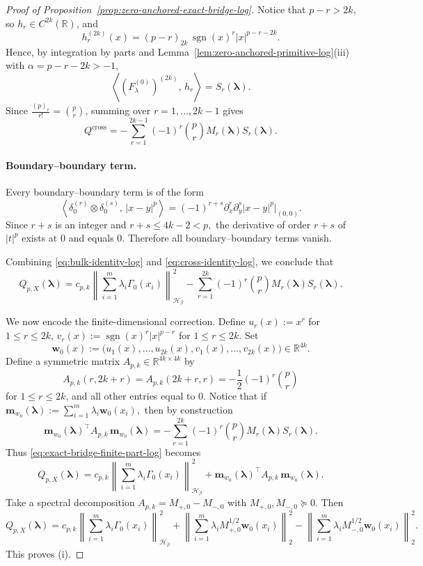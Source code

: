 \documentclass[10pt,a4paper]{amsart}
\begin{document}
\begin{proof}[Proof of Proposition~\ref{prop:zero-anchored-exact-bridge-log}]
Notice that $p-r>2k$, so $h_r\in C^{2k}(\mathbb R)$, and
\[
h_r^{(2k)}(x)
=
(p-r)_{2k}\,\operatorname{sgn}(x)^r |x|^{p-r-2k}.
\]
Hence, by integration by parts and
Lemma~\ref{lem:zero-anchored-primitive-log}\textnormal{(iii)} with
$\alpha=p-r-2k>-1$,
\[
\left\langle (F_\lambda^{(0)})^{(2k)},\,h_r\right\rangle
=
S_r(\boldsymbol\lambda).
\]
Since $\frac{(p)_r}{r!}=\binom{p}{r}$, summing over $r=1,\dots,2k-1$ gives
\begin{equation}\label{eq:cross-identity-log}
Q^{\mathrm{cross}}
=
-\sum_{r=1}^{2k-1}(-1)^r\binom{p}{r}M_r(\boldsymbol\lambda)S_r(\boldsymbol\lambda).
\end{equation}

\paragraph{Boundary--boundary term.}
Every boundary--boundary term is of the form
\[
\left\langle \delta_0^{(r)}\otimes \delta_0^{(s)},\,|x-y|^p\right\rangle
=
(-1)^{r+s}\partial_x^r\partial_y^s |x-y|^p\big|_{(0,0)}.
\]
Since $r+s$ is an integer and
\(
r+s\le 4k-2<p,
\)
the derivative of order $r+s$ of $|t|^p$ exists at $0$ and equals $0$. Therefore all
boundary--boundary terms vanish.

Combining \eqref{eq:bulk-identity-log} and \eqref{eq:cross-identity-log}, we conclude that
\begin{equation}\label{eq:exact-bridge-finite-part-log}
Q_{p,X}(\boldsymbol\lambda)
=
c_{p,k}
\left\|\sum_{i=1}^m \lambda_i \Gamma_0(x_i)\right\|_{\mathcal H_\beta}^2
-
\sum_{r=1}^{2k}(-1)^r\binom{p}{r}M_r(\boldsymbol\lambda)S_r(\boldsymbol\lambda).
\end{equation}

We now encode the finite-dimensional correction. Define
\(
u_r(x):=x^r
\)
for \(1\le r\le 2k\),
\(
v_r(x):=\operatorname{sgn}(x)^r |x|^{p-r}\)
for \(1\le r\le 2k.\)
Set
\[
\boldsymbol{w}_0(x):=
\bigl(
u_1(x),\dots,u_{2k}(x),v_1(x),\dots,v_{2k}(x)
\bigr)\in\mathbb R^{4k}.
\]
Define a symmetric matrix $A_{p,k}\in\mathbb R^{4k\times 4k}$ by
\[
A_{p,k}(r,2k+r)=A_{p,k}(2k+r,r)
=
-\frac12(-1)^r\binom{p}{r}
\]
for \(1\le r\le 2k\),
and all other entries equal to $0$. Notice that if
\(
\mathbf m_{w_0}(\boldsymbol\lambda):=\sum_{i=1}^m \lambda_i \boldsymbol w_0(x_i),
\)
then by construction
\[
\mathbf m_{w_0}(\boldsymbol\lambda)^\top A_{p,k}\,\mathbf m_{w_0}(\boldsymbol\lambda)
=
-
\sum_{r=1}^{2k}(-1)^r\binom{p}{r}M_r(\boldsymbol\lambda)S_r(\boldsymbol\lambda).
\]
Thus \eqref{eq:exact-bridge-finite-part-log} becomes
\[
Q_{p,X}(\boldsymbol\lambda)
=
c_{p,k}
\left\|\sum_{i=1}^m \lambda_i \Gamma_0(x_i)\right\|_{\mathcal H_\beta}^2
+
\mathbf m_{w_0}(\boldsymbol\lambda)^\top A_{p,k}\,\mathbf m_{w_0}(\boldsymbol\lambda).
\]
Take a spectral decomposition
\(
A_{p,k}=M_{+,0}-M_{-,0}
\)
with \(
M_{+,0},M_{-,0}\succeq 0.
\)
Then
\[
Q_{p,X}(\boldsymbol\lambda)
=
c_{p,k}
\left\|\sum_{i=1}^m \lambda_i \Gamma_0(x_i)\right\|_{\mathcal H_\beta}^2 +
\left\|\sum_{i=1}^m \lambda_i M_{+,0}^{1/2}\boldsymbol w_0(x_i)\right\|_2^2
-
\left\|\sum_{i=1}^m \lambda_i M_{-,0}^{1/2}\boldsymbol w_0(x_i)\right\|_2^2.
\]
This proves \textnormal{(i)}.



\end{proof}
\end{document}
